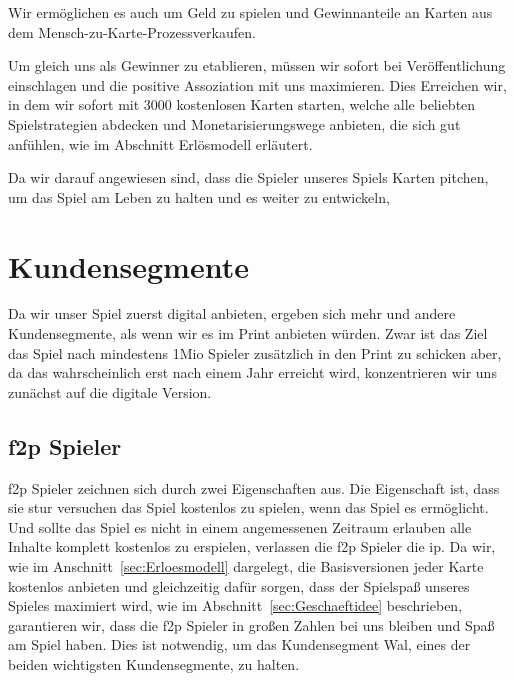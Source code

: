 \documentclass[fontsize=12, a4aper]{scrartcl}
\begin{document}
\noindent Wir ermöglichen es auch um Geld zu spielen und Gewinnanteile an Karten aus dem \glqq Mensch-zu-Karte-Prozess\grqq verkaufen.\hfill\newline

\noindent Um gleich uns als Gewinner zu etablieren, müssen wir sofort bei Veröffentlichung einschlagen und die positive Assoziation mit uns maximieren. Dies Erreichen wir, in dem wir sofort mit 3000 kostenlosen Karten starten, welche alle beliebten Spielstrategien abdecken und Monetarisierungswege anbieten, die sich gut anfühlen, wie im Abschnitt \glqq Erlösmodell\grqq{} erläutert.\hfill\newline

\noindent Da wir darauf angewiesen sind, dass die Spieler unseres Spiels Karten pitchen, um das Spiel am Leben zu halten und es weiter zu entwickeln, 

\section{Kundensegmente} \label{sec:Kundensegmente}

Da wir unser Spiel zuerst digital anbieten, ergeben sich mehr und andere Kundensegmente, als wenn wir es im Print anbieten würden. Zwar ist das Ziel das Spiel nach mindestens 1Mio Spieler zusätzlich in den Print zu schicken aber, da das wahrscheinlich erst nach einem Jahr erreicht wird, konzentrieren wir uns zunächst auf die digitale Version.

\subsection{\acl{f2p} Spieler} \label{subsec:f2p_Spieler}

\acl{f2p} Spieler zeichnen sich durch zwei Eigenschaften aus. Die Eigenschaft ist, dass sie stur versuchen das Spiel kostenlos zu spielen, wenn das Spiel es ermöglicht. Und sollte das Spiel es nicht in einem angemessenen Zeitraum erlauben alle Inhalte komplett kostenlos zu erspielen, verlassen die \ac{f2p} Spieler die \ac{ip}. Da wir, wie im Anschnitt~\ref{sec:Erloesmodell} dargelegt, die Basisversionen jeder Karte kostenlos anbieten und gleichzeitig dafür sorgen, dass der Spielspaß unseres Spieles maximiert wird, wie im Abschnitt~\ref{sec:Geschaeftidee} beschrieben, garantieren wir, dass die \ac{f2p} Spieler in großen Zahlen bei uns bleiben und Spaß am Spiel haben. Dies ist notwendig, um das Kundensegment \glqq Wal\grqq, eines der beiden wichtigsten Kundensegmente, zu halten.\hfill\newline
\end{document}
